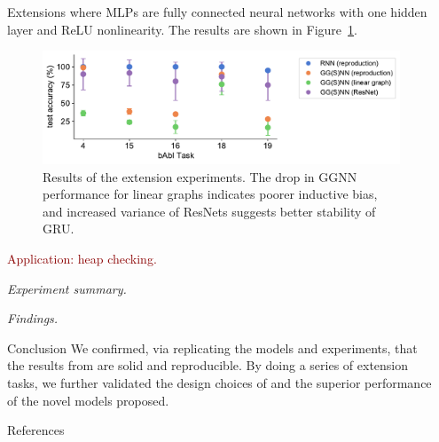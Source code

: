 \documentclass[final,hyperref={pdfpagelabels=false}]{beamer}
\begin{document}
\begin{frame}[t]
\begin{columns}[t]
\begin{column}{.3\textwidth}
\begin{block}{Extensions}
      where $\mathrm{MLP}$s are fully connected neural networks with one hidden layer and ReLU nonlinearity. The results are shown in Figure~\ref{fig:extension}. 
      \vspace{0.2in}
      \begin{figure}
            \centering
              \includegraphics[width=\textwidth]{imgs/extension_plot.pdf}
            \caption{Results of the extension experiments. The drop in GGNN performance for linear graphs indicates poorer inductive bias, and increased variance of ResNets suggests better stability of GRU.}
            \label{fig:extension}
          \end{figure}

      \textcolor{darkred}{Application: heap checking.}

      \textit{Experiment summary.}
      
      \vspace{0.2in}

      \textit{Findings.}
    
    \end{block}

    \begin{block}{Conclusion}
      We confirmed, via replicating the models and experiments, that the results from \cite{DBLP:journals/corr/LiTBZ15} are solid and reproducible. By doing a series of extension tasks, we further validated the design choices of \cite{DBLP:journals/corr/LiTBZ15} and the superior performance of the novel models proposed.
    \end{block}


    \begin{block}{References}
      \linespread{0.928}
      \printbibliography
    \end{block}
    
    

  \end{column} %

  \begin{column}{.02\textwidth}\end{column} %

\end{columns} %

\end{frame} %
\end{document}
